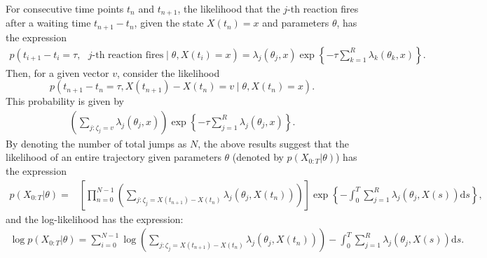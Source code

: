 \documentclass[pdflatex,sn-mathphys-num]{sn-jnl}%
\def\dd{\text{d}}
\theoremstyle{thmstyleone}%
\theoremstyle{thmstyletwo}%
\theoremstyle{thmstylethree}%
\begin{document}
For consecutive time points $t_n$ and $t_{n+1}$, the likelihood that the $j$-th reaction fires after a waiting time $t_{n+1} -t_{n}$, given the state $X(t_{n})=x$ and parameters $\theta$, has the expression \cite[Chapter 5.3.1]{Anderson2015Stochastic}
\begin{align*}
    p\left(t_{i+1} -t_{i} = \tau, \text{ $j$-th reaction fires} \mid \theta, X(t_{i})=x\right)
    = \lambda_j(\theta_j, x) 
    \exp\left\{
        - \tau \sum_{k=1}^R \lambda_k(\theta_k, x)\right\}.
\end{align*}
Then, for a given vector $v$, consider the likelihood
\[
p\left(t_{n+1} -t_{n} = \tau, X(t_{n+1}) - X(t_n) = v \mid \theta, X(t_{n})=x\right).
\]
This probability is given by
\begin{align*}
    \left(\sum_{j: \zeta_j = v}
    \lambda_j(\theta_j, x) \right)
    \exp\left\{
        - \tau \sum_{j=1}^R \lambda_j(\theta_j, x)\right\}.
\end{align*}
By denoting the number of total jumps as $N$, the above results suggest that the likelihood of an entire trajectory given parameters $\theta$ (denoted by $p\left(X_{0:T}\big| \theta\right)$) has the expression
\begin{align*}
    p\left(X_{0:T}\big| \theta\right)
    =& \left[\prod_{n=0}^{N-1}
    \left(\sum_{j: \zeta_j = X(t_{n+1}) -X(t_n)}
    \lambda_j\left(\theta_j, X(t_n)\right) \right)\right]
    \exp\left\{
        - \int_{0}^T \sum_{j=1}^R \lambda_j(\theta_j, X(s)) \dd s
    \right\},
\end{align*}
and the log-likelihood has the expression:
\begin{align*}
    \log p\left(X_{0:T}\big| \theta\right)
    = \sum_{i=0}^{N-1} \log\left(\sum_{j: \zeta_j = X(t_{n+1}) -X(t_n)}
    \lambda_j\left(\theta_j, X(t_n)\right) \right)
    - \int_{0}^T \sum_{j=1}^R \lambda_j(\theta_j, X(s)) \dd s.
\end{align*}
\end{document}
